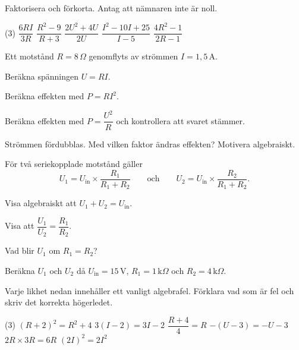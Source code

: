 Faktorisera och förkorta. Antag att nämnaren inte är noll.
\begin{delar}(3)
  \task $\dfrac{6RI}{3R}$
  \task $\dfrac{R^2 - 9}{R + 3}$
  \task $\dfrac{2U^2 + 4U}{2U}$
  \task $\dfrac{I^2 - 10I + 25}{I - 5}$
  \task $\dfrac{4R^2 - 1}{2R - 1}$
\end{delar}

Ett motstånd $R = 8\,\Omega$ genomflyts av strömmen $I = 1{,}5\,\text{A}$.
\begin{parts}
  \item Beräkna spänningen $U = RI$.
  \item Beräkna effekten med $P = RI^2$.
  \item Beräkna effekten med $P = \dfrac{U^2}{R}$ och kontrollera att svaret stämmer.
  \item Strömmen fördubblas. Med vilken faktor ändras effekten? Motivera algebraiskt.
\end{parts}

För två seriekopplade motstånd gäller
\[
  U_1 = U_{\text{in}} \times \frac{R_1}{R_1 + R_2}
  \qquad \text{och} \qquad
  U_2 = U_{\text{in}} \times \frac{R_2}{R_1 + R_2}.
\]
\begin{parts}
  \item Visa algebraiskt att $U_1 + U_2 = U_{\text{in}}$.
  \item Visa att $\dfrac{U_1}{U_2} = \dfrac{R_1}{R_2}$.
  \item Vad blir $U_1$ om $R_1 = R_2$?
  \item Beräkna $U_1$ och $U_2$ då $U_{\text{in}} = 15\,\text{V}$, $R_1 = 1\,\text{k}\Omega$ och
    $R_2 = 4\,\text{k}\Omega$.
\end{parts}

Varje likhet nedan innehåller ett vanligt algebrafel. Förklara vad som är fel och skriv det
korrekta högerledet.
\begin{delar}(3)
  \task $(R + 2)^2 = R^2 + 4$
  \task $3(I - 2) = 3I - 2$
  \task $\dfrac{R + 4}{4} = R$
  \task $-(U - 3) = -U - 3$
  \task $2R \times 3R = 6R$
  \task $(2I)^2 = 2I^2$
\end{delar}
